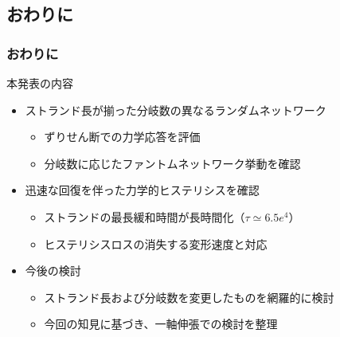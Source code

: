 \documentclass[aspectratio=169,11pt, dvipdfmx]{beamer}
\newcommand{\backupbegin}{
   \newcounter{framenumberappendix}
   \setcounter{framenumberappendix}{\value{framenumber}}
}
\begin{document}
\subsection{おわりに}
\begin{frame}
	\frametitle{おわりに}
		\begin{block}{本発表の内容}
			\begin{itemize}
				\item ストランド長が揃った分岐数の異なるランダムネットワーク
				\begin{itemize}
					\item ずりせん断での力学応答を評価
					\item 分岐数に応じたファントムネットワーク挙動を確認
				\end{itemize}
				\item 迅速な回復を伴った力学的ヒステリシスを確認
				\begin{itemize}
					\item ストランドの最長緩和時間が長時間化（$\tau \simeq 6.5e^{4}$）
					\item ヒステリシスロスの消失する変形速度と対応
				\end{itemize}
               \item 今後の検討
               \begin{itemize}
				\item ストランド長および分岐数を変更したものを網羅的に検討
				\item 今回の知見に基づき、一軸伸張での検討を整理
			   \end{itemize}  
			\end{itemize}
		\end{block}
\end{frame}





\end{document}
